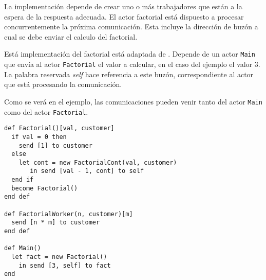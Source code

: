 La implementación depende de crear uno o más trabajadores que están a la espera de la respuesta adecuada. El actor factorial está dispuesto a procesar concurrentemente la próxima comunicación. Esta incluye la dirección de buzón a cual se debe enviar el calculo del factorial.

Está implementación del factorial está adaptada de \cite{Agha:1986:AMC:7929}. Depende de un actor \lstinline[language=sal, style=simple]$Main$ que envía al actor \lstinline[language=sal, style=simple]$Factorial$ el valor a calcular, en el caso del ejemplo el valor $3$. La palabra reservada \textit{self} hace referencia a este buzón, correspondiente al actor que está procesando la comunicación.

Como se verá en el ejemplo, las comunicaciones pueden venir tanto del actor \lstinline[language=sal, style=simple]$Main$ como del actor \lstinline[language=sal, style=simple]$Factorial$.

\begin{lstlisting}[language=sal, style=simple]
def Factorial()[val, customer]
  if val = 0 then
    send [1] to customer
  else
    let cont = new FactorialCont(val, customer)
       in send [val - 1, cont] to self
  end if 
  become Factorial()
end def

def FactorialWorker(n, customer)[m] 
  send [n * m] to customer
end def

def Main() 
  let fact = new Factorial() 
    in send [3, self] to fact
end
\end{lstlisting}

